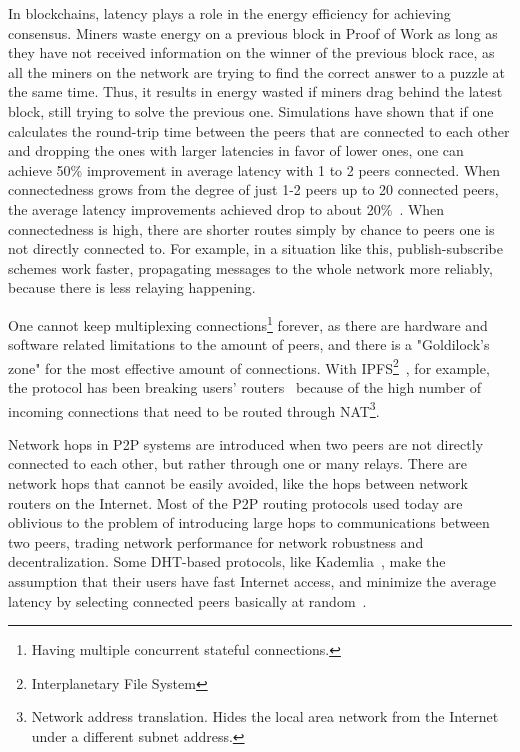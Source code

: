 In blockchains, latency plays a role in the energy efficiency for achieving consensus. Miners waste energy on a previous block in Proof of Work as long as they have not received information on the winner of the previous block race, as all the miners on the network are trying to find the correct answer to a puzzle at the same time. Thus, it results in energy wasted if miners drag behind the latest block, still trying to solve the previous one. Simulations have shown that if one calculates the round-trip time between the peers that are connected to each other and dropping the ones with larger latencies in favor of lower ones, one can achieve 50\% improvement in average latency with 1 to 2 peers connected. When connectedness grows from the degree of just 1-2 peers up to 20 connected peers, the average latency improvements achieved drop to about 20\%~\cite{Bi2018-is}. When connectedness is high, there are shorter routes simply by chance to peers one is not directly connected to. For example, in a situation like this, publish-subscribe schemes work faster, propagating messages to the whole network more reliably, because there is less relaying happening.

One cannot keep multiplexing connections\footnote{Having multiple concurrent stateful connections.} forever, as there are hardware and software related limitations to the amount of peers, and there is a "Goldilock's zone" for the most effective amount of connections. With IPFS\footnote{Interplanetary File System}~\cite{Labs_undated-uw}, for example, the protocol has been breaking users' routers~\cite{Whyrusleeping2016-ej} because of the high number of incoming connections that need to be routed through NAT\footnote{Network address translation. Hides the local area network from the Internet under a different subnet address.}.

Network hops in P2P systems are introduced when two peers are not directly connected to each other, but rather through one or many relays. There are network hops that cannot be easily avoided, like the hops between network routers on the Internet. Most of the P2P routing protocols used today are oblivious to the problem of introducing large hops to communications between two peers, trading network performance for network robustness and decentralization. Some DHT-based protocols, like Kademlia~\cite{Petar_Maymounkov2002-sx}, make the assumption that their users have fast Internet access, and minimize the average latency by selecting connected peers basically at random~\cite{Eigenmann2020-zm}.

